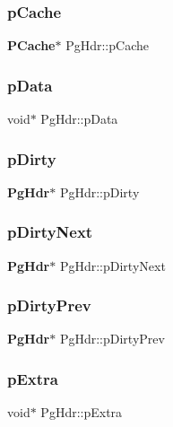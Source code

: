 \mbox{\label{struct_pg_hdr_a557aeaddd1b0805815ce06f1bfd27782}} 
\subsubsection{pCache}
{\footnotesize\ttfamily \textbf{ P\+Cache}$\ast$ Pg\+Hdr\+::p\+Cache}

\mbox{\label{struct_pg_hdr_a0f9f2ac8492c0cdad5898036db20b798}} 
\subsubsection{pData}
{\footnotesize\ttfamily void$\ast$ Pg\+Hdr\+::p\+Data}

\mbox{\label{struct_pg_hdr_a7732b1c0f19d9555ac93d4879fc95bbd}} 
\subsubsection{pDirty}
{\footnotesize\ttfamily \textbf{ Pg\+Hdr}$\ast$ Pg\+Hdr\+::p\+Dirty}

\mbox{\label{struct_pg_hdr_a61b56eb694ce445799963f7eb912e367}} 
\subsubsection{pDirtyNext}
{\footnotesize\ttfamily \textbf{ Pg\+Hdr}$\ast$ Pg\+Hdr\+::p\+Dirty\+Next}

\mbox{\label{struct_pg_hdr_a8392b45bb05d88c734020beb912304dc}} 
\subsubsection{pDirtyPrev}
{\footnotesize\ttfamily \textbf{ Pg\+Hdr}$\ast$ Pg\+Hdr\+::p\+Dirty\+Prev}

\mbox{\label{struct_pg_hdr_a8ff7430ed04077f1ae20d10801968164}} 
\subsubsection{pExtra}
{\footnotesize\ttfamily void$\ast$ Pg\+Hdr\+::p\+Extra}

